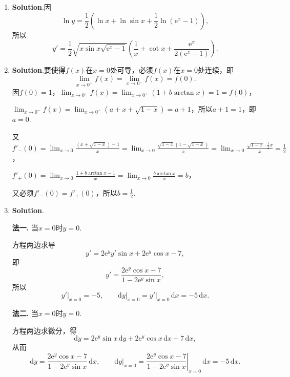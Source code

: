 \documentclass[../main.tex]{subfiles}
\begin{document}
\begin{enumerate}
          当$k=-1,\pm2,\pm3,\cdots$时，$\lim_{x\to k}f(x)=\infty$，所以$x=-1,\pm2,\pm
              3,\cdots$是无穷间断点.

    \item \textbf{Solution}.因
          \[
              \ln y=\frac{1}{2}\left(\ln x+\ln\sin x+\frac{1}{2}\ln\left(\mathrm{e}^{x}-1\right)\right),
          \]
          所以
          \[
              y'=\frac{1}{2}\sqrt{x\sin x\sqrt{\mathrm{e}^{x}-1}}\left(\frac{1}{x}+\cot x+\frac{\mathrm{e}^{x}}{2(\mathrm{e}^{x}-1)}\right).
          \]

    \item \textbf{Solution}.要使得$f(x)$在$x=0$处可导，必须$f(x)$在$x=0$处连续，即
          \[
              \lim_{x\to0^+}f(x)=\lim_{x\to0^-}f(x)=f(0).
          \]
          因$f(0)=1$，$\lim_{x\to0^+}f(x)=\lim_{x\to0^+}(1+b\arctan x)=1=f(0)$，

          $\lim_{x\to0^-}f(x)=\lim_{x\to0^-}(a+x+\sqrt{1-x})=a+1$，所以$a+1=1$，即$a=
              0$.

          又$f'_{-}(0)=\lim_{x\to0}\frac{(x+\sqrt{1-x})-1}{x}=\lim_{x\to0}\frac{\sqrt{1-x}(1-\sqrt{1-x})}{x}
              =\lim_{x\to0}\frac{\sqrt{1-x}\cdot\frac{1}{2}x}{x}=\frac{1}{2}$，

          $f'_{+}(0)=\lim_{x\to0}\frac{1+b\arctan x-1}{x}=\lim_{x\to0}\frac{b\arctan x}{x}
              =b$，

          又必须$f'_{-}(0)=f'_{+}(0)$，所以$b=\frac{1}{2}$.

    \item \textbf{Solution}.

          \textbf{法一.} 当$x=0$时$y=0$.

          方程两边求导
          \[
              y'=2\mathrm{e}^{y}y'\sin x+2\mathrm{e}^{y}\cos x-7,
          \]
          即
          \[
              y'=\frac{2\mathrm{e}^{y}\cos x-7}{1-2\mathrm{e}^{y}\sin x},
          \]
          所以
          \[
              \left.y'\right|_{x=0}=-5,\qquad\left.\mathrm{d}y\right|_{x=0}=\left.y'\right
              |_{x=0}\,\mathrm{d}x=-5\,\mathrm{d}x.
          \]

          \textbf{法二.} 当$x=0$时$y=0$.

          方程两边求微分，得
          \[
              \mathrm{d}y=2\mathrm{e}^{y}\sin x\,\mathrm{d}y+2\mathrm{e}^{y}\cos x\,\mathrm{d}
              x-7\,\mathrm{d}x,
          \]
          从而
          \[
              \mathrm{d}y=\frac{2\mathrm{e}^{y}\cos x-7}{1-2\mathrm{e}^{y}\sin x}\,\mathrm{d}
              x,\qquad\left.\mathrm{d}y\right|_{x=0}=\left.\frac{2\mathrm{e}^{y}\cos x-7}{1-2\mathrm{e}^{y}\sin
                  x}\right|_{x=0}\,\mathrm{d}x=-5\,\mathrm{d}x.
          \]


\end{enumerate}
\end{document}
